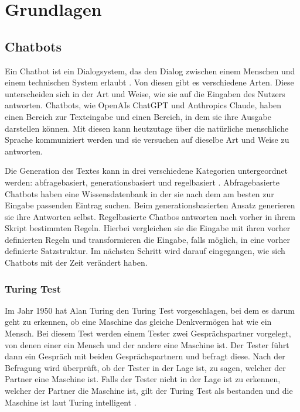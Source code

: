 \chapter{Grundlagen}
\label{c:grun}


\section{Chatbots}
\label{s:intro:bot}
Ein Chatbot ist ein Dialogsystem, das den Dialog zwischen einem Menschen und einem technischen System erlaubt \cite{adamopoulouChatbotsHistoryTechnology2020}. 
Von diesen gibt es verschiedene Arten. Diese unterscheiden sich in der Art und Weise, wie sie auf die Eingaben des Nutzers antworten. Chatbots, wie OpenAIs ChatGPT und Anthropics Claude, haben
einen Bereich zur Texteingabe und einen Bereich, in dem sie ihre Ausgabe darstellen können. Mit diesen kann heutzutage über die natürliche
menschliche Sprache kommuniziert werden und sie versuchen auf dieselbe Art und Weise zu antworten. \par
Die Generation des Textes kann in drei verschiedene Kategorien untergeordnet werden: abfragebasiert, generationsbasiert und regelbasiert \cite{adamopoulouChatbotsHistoryTechnology2020}. 
Abfragebasierte Chatbots haben eine Wissensdatenbank in der sie nach dem am besten zur Eingabe passenden Eintrag suchen.
Beim generationsbasierten Ansatz generieren sie ihre Antworten selbst.
Regelbasierte Chatbos antworten nach vorher in ihrem Skript bestimmten Regeln. Hierbei vergleichen sie die Eingabe 
mit ihren vorher definierten Regeln und transformieren die Eingabe, falls möglich, in eine vorher 
definierte Satzstruktur. \cite{adamopoulouChatbotsHistoryTechnology2020}
Im nächsten Schritt wird darauf eingegangen, wie sich Chatbots mit der Zeit verändert haben.\par

\subsection{Turing Test}
\label{s:intro:tur}
Im Jahr 1950 hat Alan Turing den Turing Test vorgeschlagen, bei dem es darum geht zu erkennen, ob eine Maschine das gleiche Denkvermögen hat wie ein Mensch. Bei
diesem Test werden einem Tester zwei Gesprächspartner vorgelegt, von denen einer ein Mensch und der andere eine Maschine ist. Der Tester führt dann ein Gespräch
mit beiden Gesprächspartnern und befragt diese. Nach der Befragung wird überprüft, ob der Tester in der Lage ist, zu sagen, welcher der Partner eine Maschine ist.
Falls der Tester nicht in der Lage ist zu erkennen, welcher der Partner die Maschine ist, gilt der Turing Test als bestanden und die Maschine ist laut Turing
intelligent \cite{lacurtsCriticismsTuringTest}.\par  
